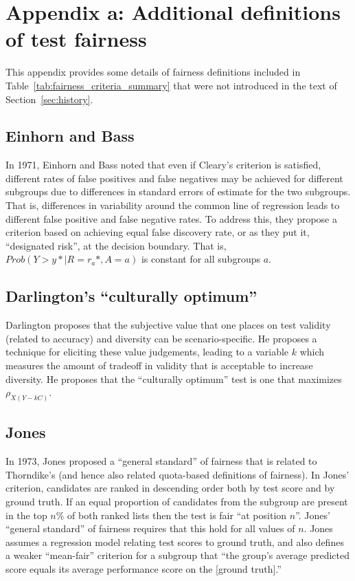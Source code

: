 \section*{Appendix a: Additional definitions of test fairness}
This appendix provides some details of fairness definitions included in Table~\ref{tab:fairness_criteria_summary} that were not introduced in the text 
of Section~\ref{sec:history}.

\subsection*{Einhorn and Bass}

In  1971, Einhorn and Bass 
\cite{einhorn1971methodological} noted that even if Cleary's criterion is satisfied, different rates of false positives and false negatives may be achieved for different subgroups due to differences in standard errors of estimate for the two subgroups.
That is, differences in variability around the common line of regression leads to different false positive and false negative rates. To address this, they propose a criterion based on achieving  equal false discovery rate, or as they put it, ``designated risk'', at the decision boundary. That is, $Prob(Y>y* | R=r_a*, A=a)$ is constant for all subgroups $a$.

\subsection*{Darlington's ``culturally optimum''}

Darlington \cite{darlington1971another} proposes that the
subjective value that one places on test validity (related to accuracy) and diversity can be scenario-specific.
He proposes a technique for eliciting these  value judgements, leading to a variable $k$ which measures the amount of tradeoff
in validity that is acceptable to increase diversity. He proposes
that the ``culturally optimum'' test is one that maximizes 
$\rho_{X(Y-kC)}$.

\subsection*{Jones}

In 1973, Jones  \cite{jones1973moderated}
proposed a ``general standard'' of fairness that is related to Thorndike's (and hence also related quota-based
definitions of fairness). In Jones' criterion, candidates are ranked in descending order both by test score and by ground truth. If an equal proportion of candidates from the subgroup are present in the top $n\%$ of both ranked lists then the test is fair ``at position $n$''. 
Jones' ``general standard'' of fairness requires that this hold for all values of $n$. Jones assumes a regression model relating test scores to ground truth, and also defines a weaker ``mean-fair'' criterion for a subgroup that
``the group's average predicted score
equals its average performance score on the [ground truth].''
